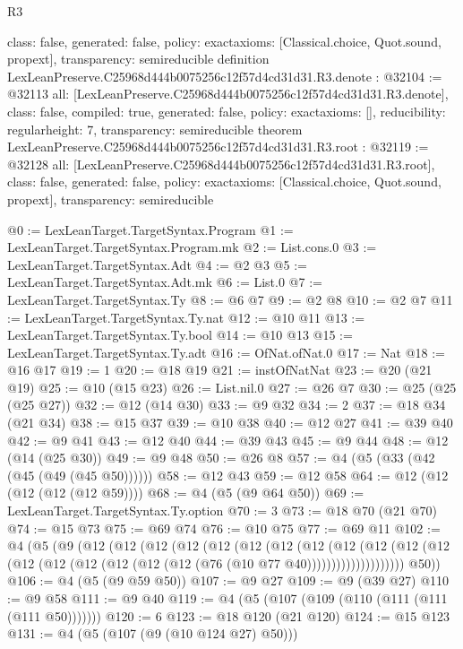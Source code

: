 \begin{lexlean}{R3}
\begin{coremodule}
{  class: false,
  generated: false,
  policy: exact{axioms: [Classical.choice, Quot.sound, propext]},
  transparency: semireducible
}
definition LexLeanPreserve.C25968d444b0075256c12f57d4cd31d31.R3.denote : @32104 := @32113 {
  all: [LexLeanPreserve.C25968d444b0075256c12f57d4cd31d31.R3.denote],
  class: false,
  compiled: true,
  generated: false,
  policy: exact{axioms: []},
  reducibility: regular{height: 7},
  transparency: semireducible
}
theorem LexLeanPreserve.C25968d444b0075256c12f57d4cd31d31.R3.root : @32119 := @32128 {
  all: [LexLeanPreserve.C25968d444b0075256c12f57d4cd31d31.R3.root],
  class: false,
  generated: false,
  policy: exact{axioms: [Classical.choice, Quot.sound, propext]},
  transparency: semireducible
}

@0 := LexLeanTarget.TargetSyntax.Program
@1 := LexLeanTarget.TargetSyntax.Program.mk
@2 := List.cons.{0}
@3 := LexLeanTarget.TargetSyntax.Adt
@4 := @2 @3
@5 := LexLeanTarget.TargetSyntax.Adt.mk
@6 := List.{0}
@7 := LexLeanTarget.TargetSyntax.Ty
@8 := @6 @7
@9 := @2 @8
@10 := @2 @7
@11 := LexLeanTarget.TargetSyntax.Ty.nat
@12 := @10 @11
@13 := LexLeanTarget.TargetSyntax.Ty.bool
@14 := @10 @13
@15 := LexLeanTarget.TargetSyntax.Ty.adt
@16 := OfNat.ofNat.{0}
@17 := Nat
@18 := @16 @17
@19 := 1
@20 := @18 @19
@21 := instOfNatNat
@23 := @20 (@21 @19)
@25 := @10 (@15 @23)
@26 := List.nil.{0}
@27 := @26 @7
@30 := @25 (@25 (@25 @27))
@32 := @12 (@14 @30)
@33 := @9 @32
@34 := 2
@37 := @18 @34 (@21 @34)
@38 := @15 @37
@39 := @10 @38
@40 := @12 @27
@41 := @39 @40
@42 := @9 @41
@43 := @12 @40
@44 := @39 @43
@45 := @9 @44
@48 := @12 (@14 (@25 @30))
@49 := @9 @48
@50 := @26 @8
@57 := @4 (@5 (@33 (@42 (@45 (@49 (@45 @50))))))
@58 := @12 @43
@59 := @12 @58
@64 := @12 (@12 (@12 (@12 (@12 @59))))
@68 := @4 (@5 (@9 @64 @50))
@69 := LexLeanTarget.TargetSyntax.Ty.option
@70 := 3
@73 := @18 @70 (@21 @70)
@74 := @15 @73
@75 := @69 @74
@76 := @10 @75
@77 := @69 @11
@102 := @4
    (@5
      (@9
        (@12
          (@12
            (@12
              (@12
                (@12
                  (@12
                    (@12
                      (@12
                        (@12
                          (@12
                            (@12
                              (@12
                                (@12 (@12 (@12 (@12 (@12 (@12 (@76 (@10 @77 @40))))))))))))))))))))
        @50))
@106 := @4 (@5 (@9 @59 @50))
@107 := @9 @27
@109 := @9 (@39 @27)
@110 := @9 @58
@111 := @9 @40
@119 := @4 (@5 (@107 (@109 (@110 (@111 (@111 (@111 @50)))))))
@120 := 6
@123 := @18 @120 (@21 @120)
@124 := @15 @123
@131 := @4 (@5 (@107 (@9 (@10 @124 @27) @50)))

\end{coremodule}
\end{lexlean}
